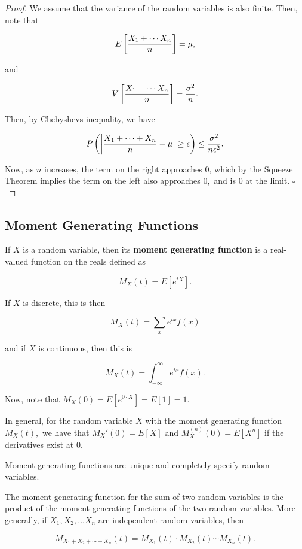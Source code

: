 \documentclass{article}
\begin{document}
\begin{proof}
We assume that the \@{variance} of the \@{random variables} is also finite. Then, note that

\[ E \left[\frac{X_1 + \cdots X_n}{n}\right] = \mu, \]

and

\[ V \left[\frac{X_1 + \cdots X_n}{n}\right] = \frac{\sigma^2}{n}. \]

Then, by \@{Chebyshevs-inequality}, we have

\[ P \left(\left| \frac{X_1 + \cdots + X_n}{n} - \mu \right| \geq \epsilon\right) \leq \frac{\sigma^2}{n \epsilon^2}. \]

Now, as $n$ increases, the term on the right approaches $0$, which by the Squeeze Theorem implies the term on the left also approaches $0,$ and is $0$ at the limit. $\square$
\end{proof}

\subsection{Moment Generating Functions}

\begin{definition}
If $X$ is a \@{random variable}, then its \textbf{moment generating function} is a real-valued \@{function} on the \@{reals} defined as

\[ M_X(t) = E[e^{tX}]. \]

If $X$ is discrete, this is then

\[ M_X(t) = \sum_{x} e^{tx}f(x) \]

and if $X$ is continuous, then this is

\[ M_X(t) = \int_{-\infty}^{\infty} e^{tx}f(x). \]
\end{definition}

Now, note that $M_X(0) = E[e^{0 \cdot X}] = E[1] = 1.$

In general, for the \@{random variable} $X$ with the \@{moment generating function} $M_X(t),$ we have that $M_X'(0) = E[X]$ and $M_X^{(n)}(0) = E[X^n]$ if the derivatives exist at $0$.

Moment generating functions are unique and completely specify random variables.

\begin{theorem}\label{mgf-of-sum}
The \@{moment-generating-function} for the sum of two \@{random variables} is the product of the moment generating functions of the two random variables. More generally, if $X_1, X_2, \dots X_n$ are \@{independent} random variables, then

\[ M_{X_1 + X_2 + \cdots + X_n}(t) = M_{X_1}(t) \cdot M_{X_2}(t) \cdots M_{X_n}(t). \]
\end{theorem}
\end{document}
